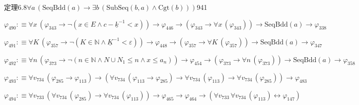 \begin{fullproof}{定理6.8}{$\forall a\,(\mathrm{SeqBdd}(a) \to \exists b\,(\mathrm{SubSeq}(b,a) \land \mathrm{Cgt}(b)))$}{941}
\begin{abbrevlist}
\item $\varphi_{490} :\equiv \forall x\,(\varphi_{343} \to \neg (x \in E \land c - \underline{k}^{-1} < x)) \to \varphi_{446} \to (\varphi_{343} \to \forall x\,(\varphi_{343})) \to \mathrm{SeqBdd}(a) \to \varphi_{338}$
\item $\varphi_{491} :\equiv \forall K\,(\varphi_{357} \to \neg (K \in \mathbb{N} \land \underline{K}^{-1} < \varepsilon)) \to \varphi_{448} \to (\varphi_{357} \to \forall K\,(\varphi_{357})) \to \mathrm{SeqBdd}(a) \to \varphi_{347}$
\item $\varphi_{492} :\equiv \forall n\,(\varphi_{373} \to \neg (n \in \mathbb{N} \land N \cup N_{1} \leq n \land x \leq a_{n})) \to \varphi_{454} \to (\varphi_{373} \to \forall n\,(\varphi_{373})) \to \mathrm{SeqBdd}(a) \to \varphi_{358}$
\item $\varphi_{493} :\equiv \forall v_{734}\,(\varphi_{285} \to \varphi_{113}) \to (\forall v_{734}\,(\varphi_{113} \to \varphi_{285}) \to \forall v_{734}\,(\varphi_{113}) \to \forall v_{734}\,(\varphi_{285})) \to \varphi_{483}$
\item $\varphi_{494} :\equiv \forall v_{733}\,(\forall v_{734}\,(\varphi_{285}) \to \forall v_{734}\,(\varphi_{113})) \to \varphi_{465} \to \varphi_{464} \to (\forall v_{733}\,\forall v_{734}\,(\varphi_{113}) \leftrightarrow \varphi_{147})$
\end{abbrevlist}
\end{fullproof}

